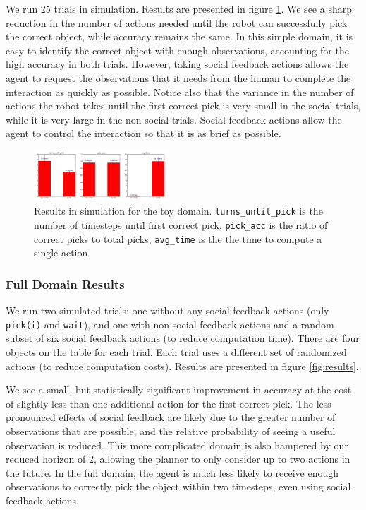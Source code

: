 \documentclass[conference]{IEEEtran}
\begin{document}
We run 25 trials in simulation. Results are presented in figure \ref{fig:toyresults}. We see a sharp reduction in the number of actions needed until the robot can successfully pick the correct object, while accuracy remains the same. In this simple domain, it is easy to identify the correct object with enough observations, accounting for the high accuracy in both trials. However, taking social feedback actions allows the agent to request the observations that it needs from the human to complete the interaction as quickly as possible. Notice also that the variance in the number of actions the robot takes until the first correct pick is very small in the social trials, while it is very large in the non-social trials. Social feedback actions allow the agent to control the interaction so that it is as brief as possible. 

\begin{figure}[H]
\begin{center}
	\includegraphics[width=0.45\textwidth]{toy_results}
\end{center}
\caption{Results in simulation for the toy domain. \texttt{turns\_until\_pick} is the number of timesteps until first correct pick,  \texttt{pick\_acc} is the ratio of correct picks to total picks, \texttt{avg\_time} is the the time to compute a single action}
	\label{fig:toyresults}
\end{figure}

\subsubsection{Full Domain Results}


We run two simulated trials: one without any social feedback actions (only \texttt{pick(i)} and \texttt{wait}), and one with non-social feedback actions and a random subset of six social feedback actions (to reduce computation time). There are four objects on the table for each trial. Each trial uses a different set of randomized actions (to reduce computation costs). Results are presented in figure \ref{fig:results}. 

We see a small, but statistically significant improvement in accuracy at the cost of slightly less than one additional action for the first correct pick. The less pronounced effects of social feedback are likely due to the greater number of observations that are possible, and the relative probability of seeing a useful observation is reduced. This more complicated domain is also hampered by our reduced horizon of 2, allowing the planner to only consider up to two actions in the future. In the full domain, the agent is much less likely to receive enough observations to correctly pick the object within two timesteps, even using social feedback actions. 
\end{document}

